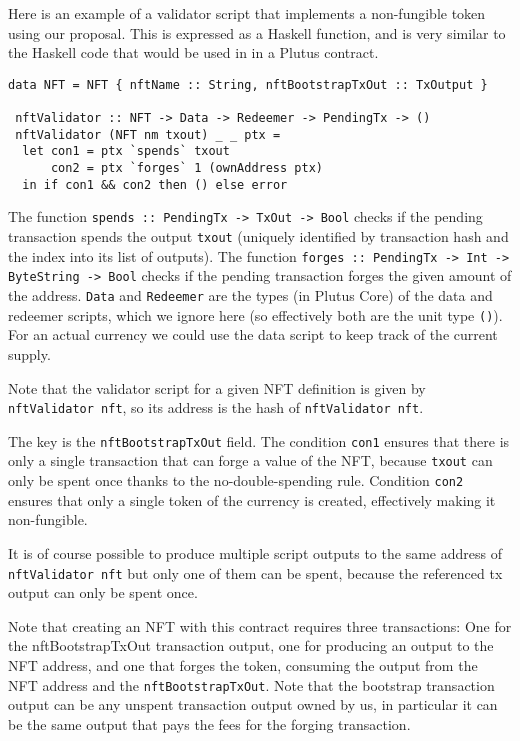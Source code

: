 \documentclass[a4paper]{article}
\theoremstyle{definition}  %
\begin{document}
\medskip 
Here is an example of a validator script that implements a
non-fungible token using our proposal.  This is expressed as a Haskell
function, and is very similar to the Haskell code that would be used
in in a Plutus contract.

\begin{lstlisting}
data NFT = NFT { nftName :: String, nftBootstrapTxOut :: TxOutput }

 nftValidator :: NFT -> Data -> Redeemer -> PendingTx -> ()
 nftValidator (NFT nm txout) _ _ ptx =
  let con1 = ptx `spends` txout
      con2 = ptx `forges` 1 (ownAddress ptx)
  in if con1 && con2 then () else error
\end{lstlisting}

\noindent The function \verb|spends :: PendingTx -> TxOut -> Bool| checks if the
pending transaction spends the output \verb|txout| (uniquely
identified by transaction hash and the index into its list of
outputs). The function
\verb|forges :: PendingTx -> Int -> ByteString -> Bool|
checks if the
pending transaction forges the given amount of the
address. \verb|Data| and \verb|Redeemer| are the types (in Plutus
Core) of the data and redeemer scripts, which we ignore here (so
effectively both are the unit type \verb|()|). For an actual currency we could use the
data script to keep track of the current supply.

Note that the validator script for a given NFT definition is given by
\verb|nftValidator nft|, so its address is the hash of
\verb|nftValidator nft|.

The key is the \verb|nftBootstrapTxOut| field. The condition
\verb|con1| ensures that there is only a single transaction that can
forge a value of the NFT, because \verb|txout| can only be spent once
thanks to the no-double-spending rule. Condition \verb|con2| ensures
that only a single token of the currency is created, effectively
making it non-fungible.

It is of course possible to produce multiple script outputs to the
same address of \verb|nftValidator nft| but only one of them can be spent,
because the referenced tx output can only be spent once.

Note that creating an NFT with this contract requires three
transactions: One for the nftBootstrapTxOut transaction output, one
for producing an output to the NFT address, and one that forges the
token, consuming the output from the NFT address and the
\verb|nftBootstrapTxOut|. Note that the bootstrap transaction output can be
any unspent transaction output owned by us, in particular it can be
the same output that pays the fees for the forging transaction.
\end{document}
